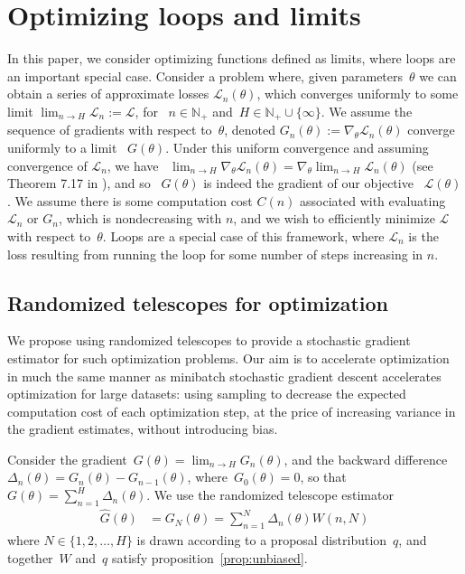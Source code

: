 \section{Optimizing loops and limits}
In this paper, we consider optimizing functions defined as limits, where loops are an important special case.
Consider a problem where, given parameters~$\theta$ we can obtain a series of approximate losses $\mathcal{L}_n(\theta)$, which converges uniformly to some limit ${\lim_{n \to H} \mathcal{L}_n := \mathcal{L}}$, for ~${n\in\mathbb{N}_{+}}$ and~${H\in\mathbb{N}_{+}\cup\{\infty\}}$.
We assume the sequence of gradients with respect to~$\theta$, denoted ${G_n(\theta) := \nabla_\theta\mathcal{L}_n(\theta)}$ converge uniformly to a limit ~${G(\theta)}$.
Under this uniform convergence and assuming convergence of $\mathcal{L}_n$, we have ~${\lim_{n \to H} \nabla_{\theta}\mathcal{L}_n(\theta) = \nabla_{\theta}\lim_{n \to H}\mathcal{L}_n(\theta)}$ (see Theorem 7.17 in \citet{rudin1976principles}), and so ~${G(\theta)}$ is indeed the gradient of our objective ~${\mathcal{L}(\theta)}$.
We assume there is some computation cost $C(n)$ associated with evaluating~$\mathcal{L}_n$ or $G_n$, which is nondecreasing with $n$, and we wish to efficiently minimize $\mathcal{L}$ with respect to~$\theta$.
Loops are a special case of this framework, where $\mathcal{L}_n$ is the loss resulting from running the loop for some number of steps increasing in $n$.

\subsection{Randomized telescopes for optimization}
We propose using randomized telescopes to provide a stochastic gradient estimator for such optimization problems.
Our aim is to accelerate optimization in much the same manner as minibatch stochastic gradient descent accelerates optimization for large datasets: using sampling to decrease the expected computation cost of each optimization step, at the price of increasing variance in the gradient estimates, without introducing bias.

Consider the gradient~${G(\theta) = \lim_{n \to H} G_n(\theta)}$, and the backward difference ${\Delta_n(\theta) = G_n(\theta) - G_{n-1}(\theta)}$, where~${G_0(\theta) = 0}$, so that~${G(\theta) = \sum_{n=1}^H \Delta_n(\theta)}$.
We use the randomized telescope estimator
\begin{align}
\hat{G}(\theta) &= G_N(\theta) = \sum_{n=1}^N\Delta_n(\theta) W(n,N)
\end{align}
where ${N \in \{1,2,\ldots,H\}}$ is drawn according to a proposal distribution~$q$, and together~$W$ and~$q$ satisfy proposition~\ref{prop:unbiased}.

